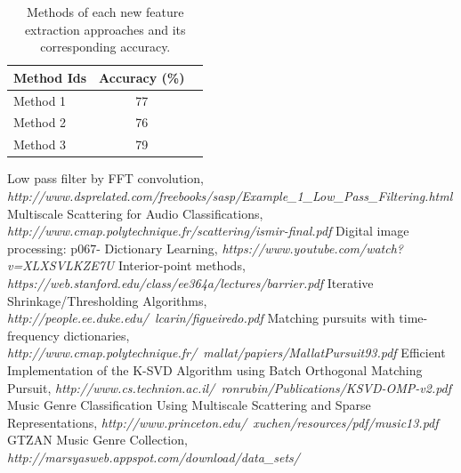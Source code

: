 \documentclass[final]{siamltexmm}
\begin{document}
\begin{table}[h!]
\centering
\begin{tabular}{ l || c | r }
      \hline
      Method Ids & Accuracy (\%) \\ \hline \hline
      Method 1 & 77 \\ \hline
      Method 2 & 76 \\ \hline
      Method 3 & 79 \\ \hline
      \hline
    \end{tabular}
\caption{Methods of each new feature extraction approaches and its corresponding accuracy.}
\label{table:1}
\end{table}

\begin{thebibliography}{10}
 {\sc Low pass filter by FFT convolution}, {\em http://www.dsprelated.com/freebooks/sasp/Example\_1\_Low\_Pass\_Filtering.html}
 {\sc Multiscale Scattering for Audio Classifications}, {\em http://www.cmap.polytechnique.fr/scattering/ismir-final.pdf}
 {\sc Digital image processing: p067- Dictionary Learning}, {\em https://www.youtube.com/watch?v=XLXSVLKZE7U}
 {\sc Interior-point methods}, {\em https://web.stanford.edu/class/ee364a/lectures/barrier.pdf}
 {\sc Iterative Shrinkage/Thresholding Algorithms}, {\em http://people.ee.duke.edu/~lcarin/figueiredo.pdf}
 {\sc Matching pursuits with time-frequency dictionaries}, {\em http://www.cmap.polytechnique.fr/~mallat/papiers/MallatPursuit93.pdf}
 {\sc Efficient Implementation of the K-SVD Algorithm using Batch Orthogonal Matching Pursuit}, {\em http://www.cs.technion.ac.il/~ronrubin/Publications/KSVD-OMP-v2.pdf}
 {\sc Music Genre Classification Using Multiscale Scattering and Sparse Representations}, {\em http://www.princeton.edu/~xuchen/resources/pdf/music13.pdf}
 {\sc GTZAN Music Genre Collection}, {\em http://marsyasweb.appspot.com/download/data\_sets/}
\end{thebibliography}
\end{document}
